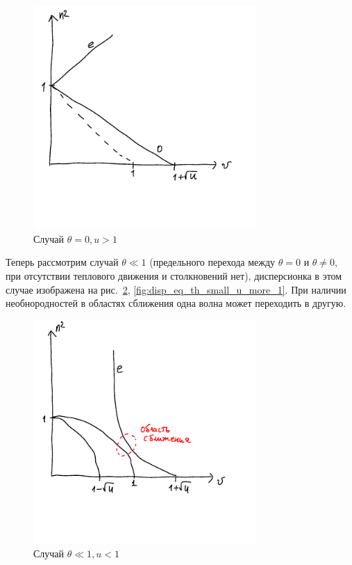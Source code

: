 \documentclass[10pt, a4paper]{article}
\begin{document}
\begin{figure}[h!]
	\begin{center}
		\includegraphics[width=85mm]{theta0-u-more-1.pdf}
	\end{center}
	\caption{Случай $\theta=0, u > 1$}
	\label{fig:disp_eq_th_0_u_more_1}
\end{figure}

Теперь рассмотрим случай $\theta \ll 1$ (предельного перехода между $\theta=0$ и $\theta \neq 0$, при отсутствии
теплового движения и столкновений нет), дисперсионка в этом случае изображена на рис.~\ref{fig:disp_eq_th_small_u_less_1}, \ref{fig:disp_eq_th_small_u_more_1}. При наличии необнородностей в областях сближения одна волна может переходить в другую.

\begin{figure}[h!]
	\begin{center}
		\includegraphics[width=85mm]{theta-small-u-less-1.pdf}
	\end{center}
	\caption{Случай $\theta\ll1, u < 1$}		
	\label{fig:disp_eq_th_small_u_less_1}
\end{figure}
\end{document}
